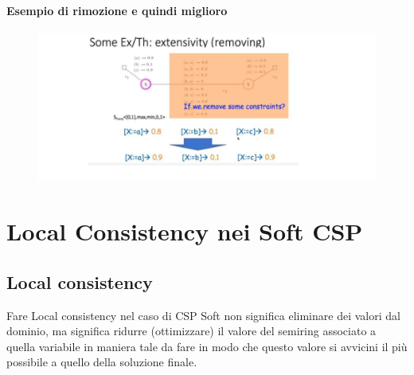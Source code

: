 \subsubsection{Esempio di rimozione e quindi miglioro}
\begin{figure}[htp]
	\centering
    \includegraphics[width=13cm, keepaspectratio]{img/Cap4/better.png}
\end{figure}
\chapter{Local Consistency nei Soft CSP} \label{ch:Local Consistency nei Soft CSP}
\section{Local consistency}
Fare Local consistency nel caso di CSP Soft non significa eliminare dei valori dal dominio, ma significa ridurre (ottimizzare) il valore del semiring associato a quella variabile in maniera tale da fare in modo che questo valore si avvicini il più possibile a quello della soluzione finale.
